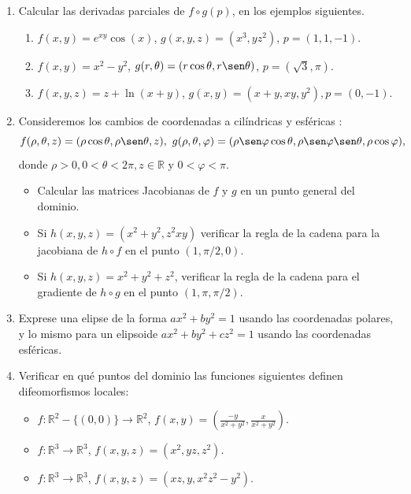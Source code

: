 \documentclass[11pt]{book}
\newcommand{\R}{\mathbb{R}}
\theoremstyle{definicion}
\theoremstyle{teorema}
\theoremstyle{ejemplo}
\begin{document}
\begin{enumerate} %
\item Calcular las derivadas parciales de $f\circ g(p)$, en los ejemplos siguientes.

  \begin{enumerate}
  \item  $f(x,y)=e^{xy}\cos(x)$, $g(x,y,z)=(x^3,yz^2)$, $p=(1,1,-1)$.
  \item $f(x,y)=x^2-y^2$, $g(r,\theta)=(r\cos\theta, r\sen\theta)$, $p=(\sqrt{3},\pi)$.
  \item $f(x,y,z)=z+\ln(x+y)$, $g(x,y)=(x+y, xy, y^2), p=(0,-1)$.
    \end{enumerate}
\item Consideremos los cambios de coordenadas a cil\'indricas y esf\'ericas :
  \[f(\rho,\theta,z)=(\rho\cos\theta, \rho\sen\theta,z), \ g(\rho,\theta,\varphi)=(\rho\sen\varphi\cos\theta, \rho\sen\varphi\sen\theta, \rho\cos\varphi),\]
  donde $\rho>0, 0<\theta<2\pi, z\in\R$ y $0<\varphi<\pi$.
  \begin{itemize}
  \item[(a)] Calcular las matrices Jacobianas de $f$ y $g$ en un punto general del dominio.
  \item[(b)] Si $h(x,y,z)=(x^2+y^2, z^2xy)$ verificar la regla de la cadena para la jacobiana de $h\circ f$ en el punto $(1,\pi/2,0)$.
    \item[(c)] Si $h(x,y,z)=x^2+y^2+z^2$, verificar la regla de la cadena para el gradiente de $h\circ g$ en el punto $(1,\pi,\pi/2)$. 
    \end{itemize}

\item Exprese una elipse de la forma $ax^2+by^2=1$ usando las coordenadas polares, y lo mismo para un elipsoide $ax^2+by^2+cz^2=1$ usando las coordenadas esféricas.
\item Verificar en qué puntos del dominio las funciones siguientes definen difeomorfismos locales:
  \begin{itemize}
  \item[(a)] $f:\R^2-\{(0,0)\}\to\R^2$, $f(x,y)=(\frac{-y}{x^2+y^2},\frac{x}{x^2+y^2})$.
   
  \item[(b)] $f:\R^3\to\R^3$, $f(x,y,z)=(x^2,yz,z^2)$.
    \item[(c)] $f:\R^3\to\R^3$, $f(x,y,z)=(xz,y,x^2z^2-y^2)$.
    \end{itemize}
\end{enumerate}
\end{document}
